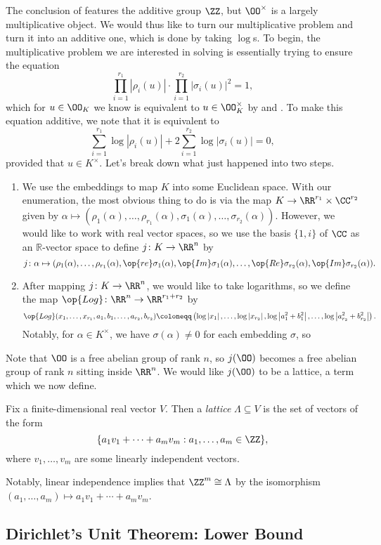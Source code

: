 \documentclass[../notes.tex]{subfiles}
\begin{document}
The conclusion of  features the additive group $\ZZ$, but $\OO^\times$ is a largely multiplicative object. We would thus like to turn our multiplicative problem and turn it into an additive one, which is done by taking $\log$s. To begin, the multiplicative problem we are interested in solving is essentially trying to ensure the equation
\[\prod_{i=1}^{r_1}\left|\rho_i(u)\right|\cdot\prod_{i=1}^{r_2}\left|\sigma_i(u)\right|^2=1,\]
which for $u\in\OO_K$ we know is equivalent to $u\in\OO_K^\times$ by  and . To make this equation additive, we note that it is equivalent to
\[\sum_{i=1}^{r_1}\log\left|\rho_i(u)\right|+2\sum_{i=1}^{r_2}\log\left|\sigma_i(u)\right|=0,\]
provided that $u\in K^\times$. Let's break down what just happened into two steps.
\begin{enumerate}
	\item We use the embeddings to map $K$ into some Euclidean space. With our enumeration, the most obvious thing to do is via the map $K\to\RR^{r_1}\times\CC^{r_2}$ given by $\alpha\mapsto(\rho_1(\alpha),\ldots,\rho_{r_1}(\alpha),\sigma_1(\alpha),\ldots,\sigma_{r_2}(\alpha))$. However, we would like to work with real vector spaces, so we use the basis $\{1,i\}$ of $\CC$ as an $\mathbb R$-vector space to define $j\colon K\to\RR^n$ by
	\[j\colon\alpha\mapsto(\rho_1(\alpha),\ldots,\rho_{r_1}(\alpha),\op{re}\sigma_1(\alpha),\op{Im}\sigma_1(\alpha),\ldots,\op{Re}\sigma_{r_2}(\alpha),\op{Im}\sigma_{r_2}(\alpha)).\]
	\item After mapping $j\colon K\to\RR^n$, we would like to take logarithms, so we define the map $\op{Log}\colon\RR^n\to\RR^{r_1+r_2}$ by
	\[\op{Log}(x_1,\ldots,x_{r_1},a_1,b_1,\ldots,a_{r_2},b_{r_2})\coloneqq\left(\log\left|x_1\right|,\ldots,\log\left|x_{r_2}\right|,\log\left|a_1^2+b_1^2\right|,\ldots,\log\left|a_{r_2}^2+b_{r_2}^2\right|\right).\]
	Notably, for $\alpha\in K^\times$, we have $\sigma(\alpha)\ne0$ for each embedding $\sigma$, so
	\[\]
\end{enumerate}
Note that $\OO$ is a free abelian group of rank $n$, so $j(\OO)$ becomes a free abelian group of rank $n$ sitting inside $\RR^n$. We would like $j(\OO)$ to be a lattice, a term which we now define.
\begin{definition}[lattice]
	Fix a finite-dimensional real vector $V$. Then a \textit{lattice} $\Lambda\subseteq V$ is the set of vectors of the form
	\[\{a_1v_1+\cdots+a_mv_m:a_1,\ldots,a_m\in\ZZ\},\]
	where $v_1,\ldots,v_m$ are some linearly independent vectors.
\end{definition}
\begin{remark}
	Notably, linear independence implies that $\ZZ^m\cong\Lambda$ by the isomorphism $(a_1,\ldots,a_m)\mapsto a_1v_1+\cdots+a_mv_m$.
\end{remark}

\subsection{Dirichlet's Unit Theorem: Lower Bound}
\end{document}
